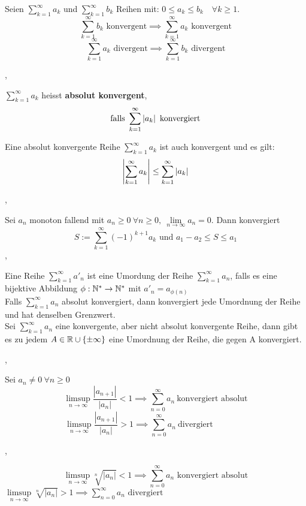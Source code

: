 \Korollar[2.7.7 (Vergleichssatz)] Seien $\sum_{k=1}^{\infty} a_{k}$ und $\sum_{k=1}^{\infty} b_{k}$ Reihen mit: $0 \leq a_{k} \leq b_{k} \quad \forall k \geq 1. $
\[ \sum_{k=1}^{\infty} b_{k} \text{ konvergent} \implies \sum_{k=1}^{\infty} a_{k} \text{ konvergent} \]
\[ \sum_{k=1}^{\infty} a_{k} \text{ divergent} \implies \sum_{k=1}^{\infty} b_{k} \text{ divergent} \]

\sep

\Satz[2.7.9] $\sum_{k=1}^{\infty} a_{k}$ heisst \textbf{absolut konvergent}, 
\[ \text{falls } \sum_{k=1}^{\infty} \left\lvert a_{k} \right\rvert \text{ konvergiert} \]

\Satz[2.7.10] Eine absolut konvergente Reihe $\sum_{k=1}^{\infty} a_{k}$ ist auch konvergent und es gilt:
\[ \left\lvert \sum_{k=1}^{\infty} a_{k} \right\rvert \leq \sum_{k=1}^{\infty} \left\lvert a_{k} \right\rvert\]


 
\sep

\Satz[2.7.12 Leibniz] Sei $a_{n}$ monoton fallend mit $a_{n} \geq 0 \ \forall n \geq 0, \ \lim\limits_{n \rightarrow \infty} a_{n} = 0.$ Dann konvergiert
\[ S :=  \sum_{k=1}^{\infty} (-1)^{k+1} a_{k} \text{ und } a_{1} - a_{2} \leq S \leq {a_1} \]
\sep

\Def[2.7.14] Eine Reihe  $\sum_{k=1}^{\infty} a'_{n}$ ist eine Umordung der Reihe  $\sum_{k=1}^{\infty} a_{n}$, falls es eine bijektive Abbildung $\phi : \mathbb{N}^{*} \rightarrow \mathbb{N}^{*}$ mit $a'_{n} = a_{\phi(n)}$  \\

\Satz[2.7.16 Dirichlet] Falls $\sum_{k=1}^{\infty} a_{n}$ absolut konvergiert, dann konvergiert jede Umordnung der Reihe und hat denselben Grenzwert.   \\

\Satz[Riemann] Sei $\sum_{k=1}^{\infty} a_{n}$ eine konvergente, aber nicht absolut konvergente Reihe, dann gibt es zu jedem $A \in \mathbb{R} \cup \{\pm \infty\}$ eine Umordnung der Reihe, die gegen A konvergiert. 

\sep

\Satz[Quotientenkriterium] Sei $a_{n} \neq 0 \ \forall n \geq 0$
\[\limsup\limits_{n \rightarrow \infty} \frac{\left|a_{n+1}\right|}{\left|a_{n}\right|}<1 \implies \sum_{n=0}^{\infty} a_{n} \ \text{konvergiert absolut}\]
\[\limsup\limits_{n \rightarrow \infty} \frac{\left|a_{n+1}\right|}{\left|a_{n}\right|}>1 \implies \sum_{n=0}^{\infty} a_{n} \ \text{divergiert} \quad \quad \quad \quad\]

\sep

\Satz[Wurzelkriterium] 
\[\limsup\limits_{n \rightarrow \infty} \sqrt[n]{\left|a_{n}\right|}<1 \implies \sum_{n=0}^{\infty} a_{n} \text{ konvergiert absolut} \]
\(\limsup\limits_{n \rightarrow \infty} \sqrt[n]{\left|a_{n}\right|}>1 \implies \sum_{n=0}^{\infty} a_{n} \text{ divergiert}\)

